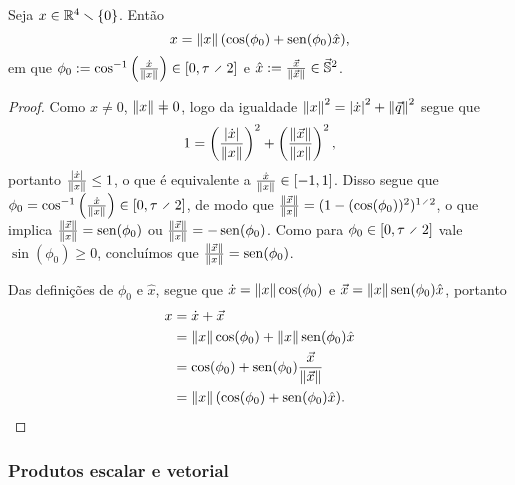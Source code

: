 \begin{proposition}
Seja $x \in \mathbb{R}^4 \smallsetminus \{0\}$. Então %
	\begin{equation*}
	x=\left\Vert{x}\right\Vert(\cos(\phi_0) + \operatorname{sen}(\phi_0) \hat{x}),
	\end{equation*}
em que $\phi_0 := \cos\inv\left( \frac{\esc{x}}{\nor{x}} \right) \in \intff{0}{\tau \div 2}$ e $\hat{x} := \frac{\vec{x}}{\left\Vert{\vec{x}}\right\Vert} \in \vec{\mathbb{S}}^2$.
\end{proposition}
\begin{proof}
Como $x \neq 0$, $\nor{x} \neq 0$, logo da igualdade $\left\Vert{x}\right\Vert^2 = \left\vert{\dot{x}}\right\vert^2 + \left\Vert{\vec{q}}\right\Vert^2$ segue que
	\begin{equation*}
	1 = \left( \frac{\left\vert{\dot{x}}\right\vert}{\left\Vert{x}\right\Vert} \right)^2 + \left( \frac{\left\Vert{\vec{x}}\right\Vert}{\left\Vert{x}\right\Vert} \right)^2,
	\end{equation*}
portanto $\frac{\left\vert{\dot{x}}\right\vert}{\left\Vert{x}\right\Vert} \leq 1$, o que é equivalente a $\frac{\dot{x}}{\left\Vert{x}\right\Vert} \in \left[{-1},{1}\right]$. Disso segue que $\phi_0 = \cos\inv\left( \frac{\esc{x}}{\nor{x}} \right) \in \intff{0}{\tau \div 2}$, de modo que $\frac{\nor{\vec{x}}}{\nor{x}} = (1-(\cos(\phi_0))^2)^{1 \div 2}$, o que implica $\frac{\left\Vert{\vec{x}}\right\Vert}{\left\Vert{x}\right\Vert}=\operatorname{sen}(\phi_0)$ ou $\frac{\left\Vert{\vec{x}}\right\Vert}{\left\Vert{x}\right\Vert}=-\operatorname{sen}(\phi_0)$. Como para $\phi_0 \in \intff{0}{\tau \div 2}$ vale $\sin(\phi_0) \geq 0$, concluímos que $\frac{\left\Vert{\vec{x}}\right\Vert}{\left\Vert{x}\right\Vert}=\operatorname{sen}(\phi_0)$.

Das definições de $\phi_0$ e $\hat{x}$, segue que $\dot{x} = \left\Vert{x}\right\Vert\cos(\phi_0)$ e $\vec{x} = \left\Vert{x}\right\Vert\operatorname{sen}(\phi_0)\hat{x}$, portanto
	\begin{align*}
	x &= \dot{x} + \vec{x} \\
		&= \left\Vert{x}\right\Vert\cos(\phi_0) + \left\Vert{x}\right\Vert\operatorname{sen}(\phi_0)\hat{x} \\
		&= \cos(\phi_0) + \operatorname{sen}(\phi_0) \frac{\vec{x}}{\left\Vert{\vec{x}}\right\Vert} \\
		&= \left\Vert{x}\right\Vert (\cos(\phi_0) + \operatorname{sen}(\phi_0) \hat{x}).
	\end{align*}
\end{proof}

\subsubsection{Produtos escalar e vetorial}

